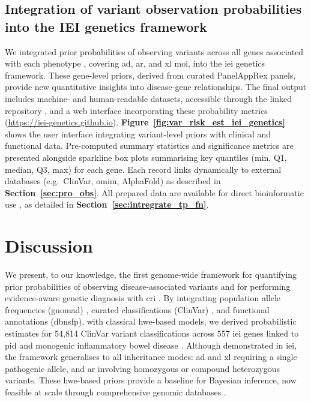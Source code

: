 \subsection{Integration of variant observation probabilities into the IEI genetics framework}
We integrated prior probabilities of observing variants across all genes associated with each phenotype \cite{poli_human_2025}, covering \ac{ad}, \ac{ar}, and \ac{xl} \ac{moi}, into the \ac{iei} genetics framework. 
These gene-level priors, derived from curated PanelAppRex panels, provide new quantitative insights into disease-gene relationships. 
The final output includes machine- and human-readable datasets, accessible through the linked repository \cite{lawless_2025_15111584}, and a web interface incorporating these probability metrics (\url{https://iei-genetics.github.io}).
\textbf{Figure~\ref{fig:var_risk_est_iei_genetics}} shows the user interface integrating variant-level priors with clinical and functional data. 
Pre-computed summary statistics and significance metrics are presented alongside sparkline box plots summarising key quantiles (min, Q1, median, Q3, max) for each gene. 
Each record links dynamically to external databases (e.g.\ ClinVar, \ac{omim}, AlphaFold) as described in \textbf{Section~\ref{sec:pro_obs}}. 
All prepared data are available for direct bioinformatic use \cite{lawless_2025_15111584}, as detailed in \textbf{Section~\ref{sec:intregrate_tp_fn}}.

\FloatBarrier

\section{Discussion}

We present, to our knowledge, the first genome-wide framework for quantifying prior probabilities of observing disease-associated variants and for performing evidence-aware genetic diagnosis with \ac{cri} \cite{hannah_using_2024, bick_estimating_2025}. By integrating population allele frequencies (\ac{gnomad}) \cite{karczewski2020mutational}, curated classifications (ClinVar) \cite{landrum_clinvar_2018}, and functional annotations (\ac{dbnsfp}), with classical \ac{hwe}-based models, we derived probabilistic estimates for 54,814 ClinVar variant classifications across 557 \ac{iei} genes linked to \ac{pid} and monogenic inflammatory bowel disease \cite{lawless_panelapprex_2025, poli_human_2025}. 
Although demonstrated in \ac{iei}, the framework generalises to all inheritance modes: \ac{ad} and \ac{xl} requiring a single pathogenic allele, and \ac{ar} involving homozygous or compound heterozygous variants. These \ac{hwe}-based priors provide a baseline for Bayesian inference, now feasible at scale through comprehensive genomic databases \cite{landrum_clinvar_2018, karczewski2020mutational, lawless_panelapprex_2025, cheng_accurate_2023}.

